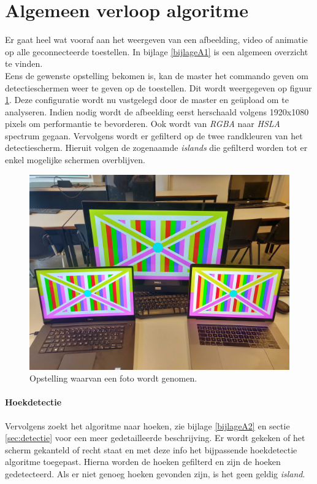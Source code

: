 \section{Algemeen verloop algoritme}
Er gaat heel wat vooraf aan het weergeven van een afbeelding, video of animatie op alle geconnecteerde toestellen. In bijlage \ref{bijlageA1} is een algemeen overzicht te vinden.\\[3mm]
Eens de gewenste opstelling bekomen is, kan de master het commando geven om detectieschermen weer te geven op de toestellen. Dit wordt weergegeven op figuur \ref{fig:opstelling}. Deze configuratie wordt nu vastgelegd door de master en geüpload om te analyseren. Indien nodig wordt de afbeelding eerst herschaald volgens 1920x1080 pixels om performantie te bevorderen. Ook wordt van {\it RGBA} naar {\it HSLA} spectrum gegaan. Vervolgens wordt er gefilterd op de twee randkleuren van het detectiescherm. Hieruit volgen de zogenaamde {\it islands} die gefilterd worden tot er enkel mogelijke schermen overblijven.

\begin{figure}[H]
	\centering
	\includegraphics[scale=0.06]{img/opstelling.jpg}
	\caption{Opstelling waarvan een foto wordt genomen.}
	\label{fig:opstelling}
\end{figure}

\paragraph{Hoekdetectie}
Vervolgens zoekt het algoritme naar hoeken, zie bijlage \ref{bijlageA2} en sectie \ref{sec:detectie} voor een meer gedetailleerde beschrijving. Er wordt gekeken of het scherm gekanteld of recht staat en met deze info het bijpassende hoekdetectie algoritme toegepast. Hierna worden de hoeken gefilterd en zijn de hoeken gedetecteerd. Als er niet genoeg hoeken gevonden zijn, is het geen geldig {\it island}.

